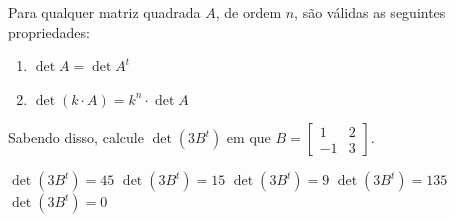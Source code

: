 Para qualquer matriz quadrada $A$, de ordem $n$, são válidas as seguintes propriedades:
\begin{enumerate}[1)]
	\item $\det A=\det A^t$
	\item $\det(k\cdot A)=k^n\cdot \det A$
\end{enumerate}
Sabendo disso, calcule $\det(3B^t)$ em que $B = \left[ \begin{array}{cc}
1 & 2 \\
-1 & 3
\end{array} \right]$.

$\det(3B^t)=45$
$\det(3B^t)=15$
$\det(3B^t)=9$
$\det(3B^t)=135$
$\det(3B^t)=0$


